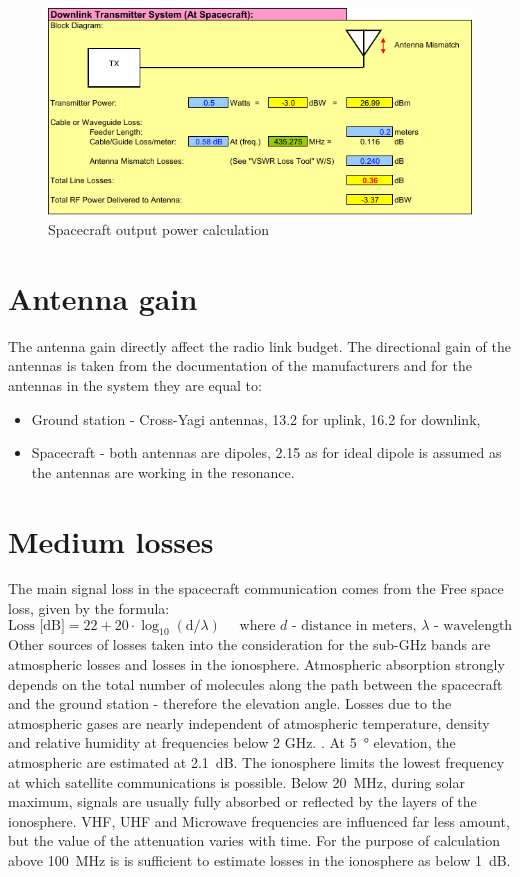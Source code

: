\begin{figure}
    \centering
    \includegraphics[width=0.8\paperwidth]{img/8/tx_spacecraft.pdf}
    \caption{Spacecraft output power calculation}
    \label{link:tx_spacecraft}
\end{figure}


\section{Antenna gain}
The antenna gain directly affect the radio link budget. The directional gain of the antennas is taken from the documentation of the manufacturers and for the antennas in the system they are equal to:
\begin{itemize}
    \item Ground station - Cross-Yagi antennas, \SI{13.2}{\dBi} for uplink, \SI{16.2}{\dBi} for downlink,
    \item Spacecraft - both antennas are dipoles, \SI{2.15}{\dBi} as for ideal dipole is assumed as the antennas are working in the resonance. 
\end{itemize}


\section{Medium losses}
The main signal loss in the spacecraft communication comes from the Free space loss, given by the formula: 
$$\text{Loss [dB]} = 22 + 20 \cdot \log_{10} (\text{d}/\lambda) \text{~~~~where $d$ - distance in meters, $\lambda$ - wavelength}$$ Other sources of losses taken into the consideration for the sub-GHz bands are atmospheric losses and losses in the ionosphere. Atmospheric absorption strongly depends on the total number of molecules along the path between the spacecraft and the ground station - therefore the elevation angle. Losses due to the atmospheric gases are nearly independent of atmospheric temperature, density and relative humidity at frequencies below 2 GHz. \cite{sat_propagation}. At \SI{5}{\degree} elevation, the atmospheric are estimated at \SI{2.1}{\dB}. The ionosphere limits the lowest frequency at which satellite communications is possible. Below \SI{20}{\MHz}, during solar maximum, signals are usually fully absorbed or reflected by the layers of the ionosphere. VHF, UHF and Microwave frequencies are influenced far less amount, but the value of the attenuation varies with time. For the purpose of calculation above \SI{100}{\MHz} is is sufficient to estimate losses in the ionosphere as below \SI{1}{\dB}.

